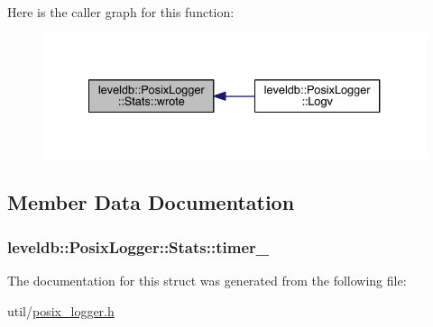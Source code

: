 Here is the caller graph for this function\+:
\nopagebreak
\begin{figure}[H]
\begin{center}
\leavevmode
\includegraphics[width=334pt]{structleveldb_1_1_posix_logger_1_1_stats_aa6d955c21fe636108dd79675a0ff5051_icgraph}
\end{center}
\end{figure}




\subsection{Member Data Documentation}
\hypertarget{structleveldb_1_1_posix_logger_1_1_stats_af8be2f72cd5f8cceac91f08487c2c5d2}{}
\subsubsection[{timer\+\_\+}]{ leveldb\+::\+Posix\+Logger\+::\+Stats\+::timer\+\_\+}\label{structleveldb_1_1_posix_logger_1_1_stats_af8be2f72cd5f8cceac91f08487c2c5d2}


The documentation for this struct was generated from the following file\+:\begin{DoxyCompactItemize}
\item 
util/\hyperlink{posix__logger_8h}{posix\+\_\+logger.\+h}\end{DoxyCompactItemize}
